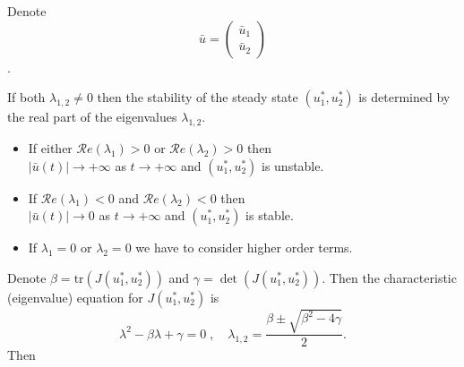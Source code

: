 \documentclass[
  letterpaper,
  DIV=11,
  numbers=noendperiod]{scrreprt}
\theoremstyle{definition}
\theoremstyle{plain}
\theoremstyle{plain}
\theoremstyle{remark}
\begin{document}
Denote \[\bar u=
\begin{pmatrix} \bar u_1 \\
\bar u_2 
\end{pmatrix}
\].

If both \(\lambda_{1,2} \neq 0\) then the stability of the steady state
\((u^\ast_1, u^\ast_2)\) is determined by the real part of the
eigenvalues \(\lambda_{1,2}\).

\begin{itemize}
\item
  If either \(\mathcal Re (\lambda_1)>0\) or
  \(\mathcal Re (\lambda_2)>0\) then\\
  \(|\bar u(t)| \to +\infty\) as \(t \to + \infty\) and
  \((u^\ast_1, u^\ast_2)\) is unstable.
\item
  If \(\mathcal Re (\lambda_1)<0\) and \(\mathcal Re (\lambda_2)<0\)
  then\\
  \(|\bar u(t)| \to 0\) as \(t \to + \infty\) and
  \((u^\ast_1, u^\ast_2)\) is stable.
\item
  If \(\lambda_1=0\) or \(\lambda_2=0\) we have to consider higher order
  terms.
\end{itemize}

Denote \(\beta = \textrm{tr} (J( u^\ast_1, u^\ast_2))\) and
\(\gamma= \det(J( u^\ast_1, u^\ast_2))\). Then the characteristic
(eigenvalue) equation for \(J( u^\ast_1, u^\ast_2)\) is \[
\lambda^2 - \beta \lambda + \gamma = 0 \; , \quad  \lambda_{1,2} = \frac{ \beta \pm \sqrt{ \beta^2 - 4 \gamma}} 2.
\] Then
\end{document}
